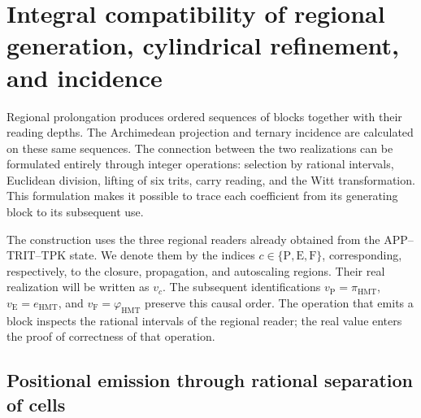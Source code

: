 
\section[Regional generation and refinement]{Integral compatibility of regional generation, cylindrical refinement, and incidence}
\label{act21:sec:df-lectores-cilindros}

Regional prolongation produces ordered sequences of blocks together with
their reading depths. The Archimedean projection and ternary incidence
are calculated on these same sequences. The connection between the two
realizations can be formulated entirely through integer operations:
selection by rational intervals, Euclidean division, lifting of six
trits, carry reading, and the Witt transformation. This formulation makes
it possible to trace each coefficient from its generating block to its
subsequent use.

The construction uses the three regional readers already obtained from the
APP--TRIT--TPK state. We denote them by the indices
\(c\in\{\mathrm P,\mathrm E,\mathrm F\}\), corresponding, respectively,
to the closure, propagation, and autoscaling regions. Their real realization
will be written as \(v_c\). The subsequent identifications
\(v_{\mathrm P}=\pi_{\mathrm{HMT}}\),
\(v_{\mathrm E}=e_{\mathrm{HMT}}\), and
\(v_{\mathrm F}=\varphi_{\mathrm{HMT}}\) preserve this causal order.
The operation that emits a block inspects the rational intervals of the
regional reader; the real value enters the proof of correctness of that
operation.

\subsection{Positional emission through rational separation of cells}
\label{act21:subsec:df-emision-racional}


